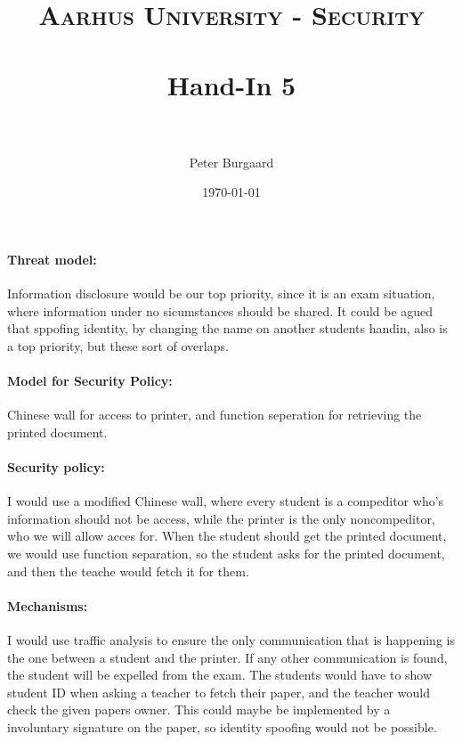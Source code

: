 \documentclass[paper=a4, fontsize=11pt]{scrartcl} %
\title{	
	\normalfont \normalsize 
	\textsc{Aarhus University - Security} \\ [25pt] %
	\horrule{0.5pt} \\[0.4cm] %
	\huge Hand-In 5 \\ %
	\horrule{2pt} \\[0.5cm] %
}
\author{Peter Burgaard} %
\date{\normalsize\today} %
\numberwithin{equation}{section} %
\numberwithin{figure}{section} %
\numberwithin{table}{section} %
\begin{document}
	
	\maketitle %
	
	\paragraph{Threat model:} Information disclosure would be our top priority, since it is an exam situation, where information under no sicumstances should be shared. It could be agued that sppofing identity, by changing the name on another students handin, also is a top priority, but these sort of overlaps.
	
	\paragraph{Model for Security Policy: } Chinese wall for access to printer, and function seperation for retrieving the printed document.
	
	\paragraph{Security policy:} I would use a modified Chinese wall, where every student is a compeditor who's information should not be access, while the printer is the only noncompeditor, who we will allow acces for.  When the student should get the printed document, we would use function separation, so the student asks for the printed document, and then the teache would fetch it for them.
	
	\paragraph{Mechanisms: } I would use traffic analysis to ensure the only communication that is happening is the one between a student and the printer. If any other communication is found, the student will be expelled from the exam. The students would have to show student ID when asking a teacher to fetch their paper, and the teacher would check the given papers owner. This could maybe be implemented by a involuntary signature on the paper, so identity spoofing would not be possible. 
\end{document}
